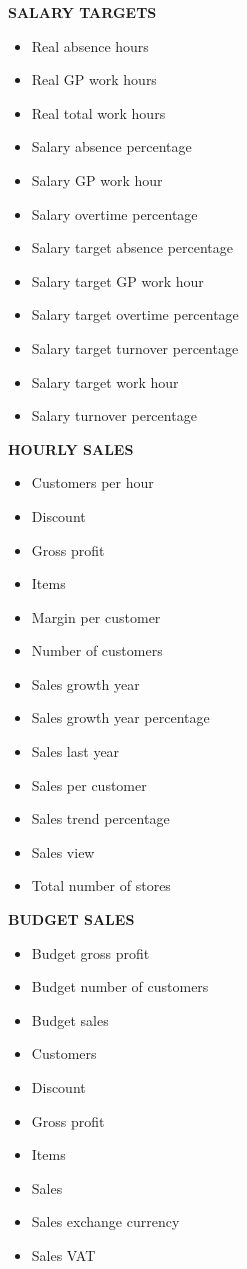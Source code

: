 \documentclass[]{book}
\providecommand{\tightlist}{%
  \setlength{\itemsep}{0pt}\setlength{\parskip}{0pt}}
\begin{document}
\textbf{SALARY TARGETS }

\begin{itemize}
\tightlist
\item
  Real absence hours
\item
  Real GP work hours
\item
  Real total work hours
\item
  Salary absence percentage
\item
  Salary GP work hour
\item
  Salary overtime percentage
\item
  Salary target absence percentage
\item
  Salary target GP work hour
\item
  Salary target overtime percentage
\item
  Salary target turnover percentage
\item
  Salary target work hour
\item
  Salary turnover percentage
\end{itemize}

\textbf{HOURLY SALES }

\begin{itemize}
\tightlist
\item
  Customers per hour
\item
  Discount
\item
  Gross profit
\item
  Items
\item
  Margin per customer
\item
  Number of customers
\item
  Sales growth year
\item
  Sales growth year percentage
\item
  Sales last year
\item
  Sales per customer
\item
  Sales trend percentage
\item
  Sales view
\item
  Total number of stores
\end{itemize}

\textbf{BUDGET SALES }

\begin{itemize}
\tightlist
\item
  Budget gross profit
\item
  Budget number of customers
\item
  Budget sales
\item
  Customers
\item
  Discount
\item
  Gross profit
\item
  Items
\item
  Sales
\item
  Sales exchange currency
\item
  Sales VAT
\end{itemize}
\end{document}
